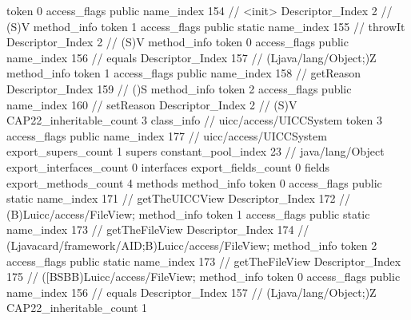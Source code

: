{{{{{					token	0
					access_flags	public
					name_index	154		// <init>
					Descriptor_Index	2		// (S)V
				}
				method_info {
					token	1
					access_flags	public static
					name_index	155		// throwIt
					Descriptor_Index	2		// (S)V
				}
				method_info {
					token	0
					access_flags	public
					name_index	156		// equals
					Descriptor_Index	157		// (Ljava/lang/Object;)Z
				}
				method_info {
					token	1
					access_flags	public
					name_index	158		// getReason
					Descriptor_Index	159		// ()S
				}
				method_info {
					token	2
					access_flags	public
					name_index	160		// setReason
					Descriptor_Index	2		// (S)V
				}
			}
			CAP22_inheritable_count	3
		}
		class_info {		// uicc/access/UICCSystem
			token	3
			access_flags	public
			name_index	177		// uicc/access/UICCSystem
			export_supers_count	1
			supers {
				constant_pool_index	23		// java/lang/Object
			}
			export_interfaces_count	0
			interfaces {
			}
			export_fields_count	0
			fields {
			}
			export_methods_count	4
			methods {
				method_info {
					token	0
					access_flags	public static
					name_index	171		// getTheUICCView
					Descriptor_Index	172		// (B)Luicc/access/FileView;
				}
				method_info {
					token	1
					access_flags	public static
					name_index	173		// getTheFileView
					Descriptor_Index	174		// (Ljavacard/framework/AID;B)Luicc/access/FileView;
				}
				method_info {
					token	2
					access_flags	public static
					name_index	173		// getTheFileView
					Descriptor_Index	175		// ([BSBB)Luicc/access/FileView;
				}
				method_info {
					token	0
					access_flags	public
					name_index	156		// equals
					Descriptor_Index	157		// (Ljava/lang/Object;)Z
				}
			}
			CAP22_inheritable_count	1
		}
	}
}
